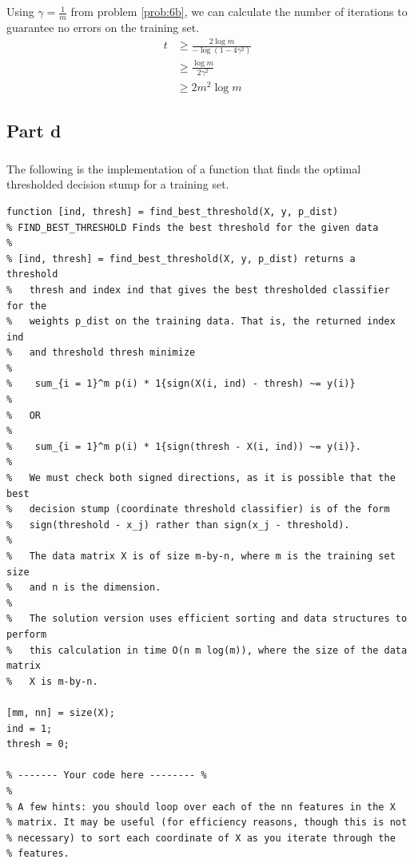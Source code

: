 \documentclass[11pt,a4paper,titlepage]{article}
\begin{document}
{\subsection{}{
\quad Using $\gamma = \frac{1}{m}$ from problem \ref{prob:6b}, we can calculate the number of iterations to guarantee no errors on the training set.
\begin{align*}
	t &\geq \frac{2\log m}{-\log(1-4\gamma^2)}
    \\ &\geq \frac{\log m}{2\gamma^2}
    \\ &\geq 2m^2\log m
\end{align*}
}\label{prob:6c}
\subsection*{Part d}{
\subsubsection{}{
\quad The following is the implementation of a function that finds the optimal thresholded decision stump for a training set.
\begin{verbatim}
function [ind, thresh] = find_best_threshold(X, y, p_dist)
% FIND_BEST_THRESHOLD Finds the best threshold for the given data
%
% [ind, thresh] = find_best_threshold(X, y, p_dist) returns a threshold
%   thresh and index ind that gives the best thresholded classifier for the
%   weights p_dist on the training data. That is, the returned index ind
%   and threshold thresh minimize
%
%    sum_{i = 1}^m p(i) * 1{sign(X(i, ind) - thresh) ~= y(i)}
%
%   OR
%
%    sum_{i = 1}^m p(i) * 1{sign(thresh - X(i, ind)) ~= y(i)}.
%
%   We must check both signed directions, as it is possible that the best
%   decision stump (coordinate threshold classifier) is of the form
%   sign(threshold - x_j) rather than sign(x_j - threshold).
%
%   The data matrix X is of size m-by-n, where m is the training set size
%   and n is the dimension.
%
%   The solution version uses efficient sorting and data structures to perform
%   this calculation in time O(n m log(m)), where the size of the data matrix
%   X is m-by-n.

[mm, nn] = size(X);
ind = 1;
thresh = 0;

% ------- Your code here -------- %
%
% A few hints: you should loop over each of the nn features in the X
% matrix. It may be useful (for efficiency reasons, though this is not
% necessary) to sort each coordinate of X as you iterate through the
% features.


\end{verbatim}}}}
\end{document}
